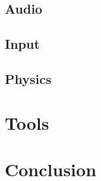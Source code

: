 \documentclass{projdoc}
\begin{document}
\subsection{Audio}

\subsection{Input}

\subsection{Physics}

\section{Tools}

\section{Conclusion}
\end{document}
